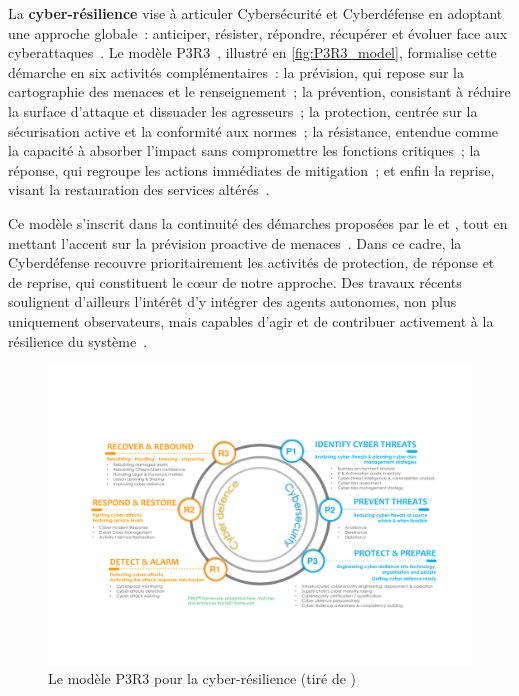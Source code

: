 La \textbf{cyber-résilience} vise à articuler Cybersécurité et Cyberdéfense en adoptant une approche globale~: anticiper, résister, répondre, récupérer et évoluer face aux cyberattaques~\cite{NISTresilience}. Le modèle P3R3~\cite{Theron2013P3R3}, illustré en \autoref{fig:P3R3_model}, formalise cette démarche en six activités complémentaires~: la prévision, qui repose sur la cartographie des menaces et le renseignement~; la prévention, consistant à réduire la surface d'attaque et dissuader les agresseurs~; la protection, centrée sur la sécurisation active et la conformité aux normes~; la résistance, entendue comme la capacité à absorber l'impact sans compromettre les fonctions critiques~; la réponse, qui regroupe les actions immédiates de mitigation~; et enfin la reprise, visant la restauration des services altérés~\cite{Theron2013P3R3}.

Ce modèle s'inscrit dans la continuité des démarches proposées par le  et , tout en mettant l'accent sur la prévision proactive de menaces~\cite{Theron2013P3R3}. Dans ce cadre, la Cyberdéfense recouvre prioritairement les activités de protection, de réponse et de reprise, qui constituent le cœur de notre approche. Des travaux récents soulignent d'ailleurs l'intérêt d'y intégrer des agents autonomes, non plus uniquement observateurs, mais capables d'agir et de contribuer activement à la résilience du système~\cite{Kott2023}.

\begin{figure}[h]
  \centering
  \includegraphics[width=\linewidth]{figures/P3R3.pdf}
  \caption{Le modèle P3R3 pour la cyber-résilience (tiré de \autocite{Kott2023})}
  \label{fig:P3R3_model}
\end{figure}

